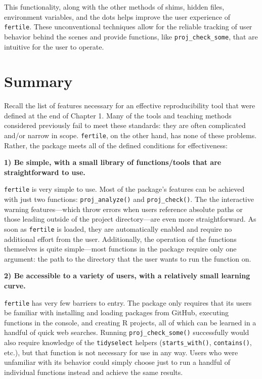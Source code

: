 \documentclass[12pt,twoside]{reedthesis}
\begin{document}
This functionality, along with the other methods of shims, hidden files,
environment variables, and the dots helps improve the user experience of
\texttt{fertile}. These unconventional techniques allow for the reliable
tracking of user behavior behind the scenes and provide functions, like
\texttt{proj\_check\_some}, that are intuitive for the user to operate.

\section{Summary}\label{summary}

Recall the list of features necessary for an effective reproducibility
tool that were defined at the end of Chapter 1. Many of the tools and
teaching methods considered previously fail to meet these standards:
they are often complicated and/or narrow in scope. \texttt{fertile}, on
the other hand, has none of these problems. Rather, the package meets
all of the defined conditions for effectiveness:

\textbf{1) Be simple, with a small library of functions/tools that are
straightforward to use.}

\texttt{fertile} is very simple to use. Most of the package's features
can be achieved with just two functions: \texttt{proj\_analyze()} and
\texttt{proj\_check()}. The the interactive warning features---which
throw errors when users reference absolute paths or those leading
outside of the project directory---are even more straightforward. As
soon as \texttt{fertile} is loaded, they are automatically enabled and
require no additional effort from the user. Additionally, the operation
of the functions themselves is quite simple---most functions in the
package require only one argument: the path to the directory that the
user wants to run the function on.

\textbf{2) Be accessible to a variety of users, with a relatively small
learning curve.}

\texttt{fertile} has very few barriers to entry. The package only
requires that its users be familiar with installing and loading packages
from GitHub, executing functions in the console, and creating R
projects, all of which can be learned in a handful of quick web
searches. Running \texttt{proj\_check\_some()} successfully would also
require knowledge of the \texttt{tidyselect} helpers
(\texttt{starts\_with()}, \texttt{contains()}, etc.), but that function
is not necessary for use in any way. Users who were unfamiliar with its
behavior could simply choose just to run a handful of individual
functions instead and achieve the same results.
\end{document}
